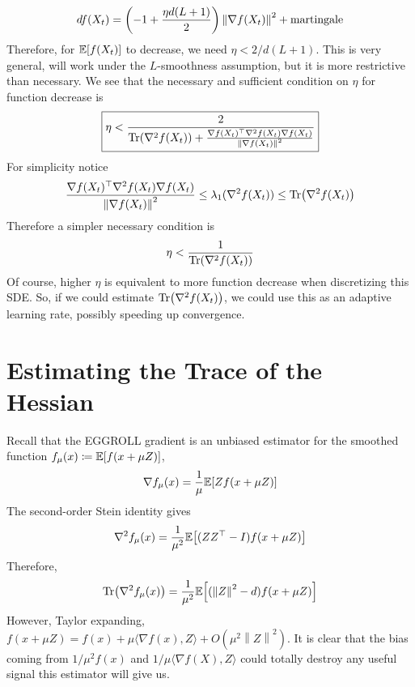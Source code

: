 \documentclass[twoside,11pt]{article}
\newcommand{\mg}[1]{\left \| #1 \right\|}
\newcommand{\E}{\mathbb{E}\qty}
\renewcommand{\grad}{\nabla}
\newcommand{\1}{\mathbbm{1}}
\begin{document}
\begin{align*}
    df(X_t) = \qty(-1+\frac{\eta d(L+1)}{2}) \mg{\grad f(X_t)}^2 + \mathrm{martingale}
\end{align*}
Therefore, for $\E[f(X_t)]$ to decrease, we need $\eta < 2/d(L+1)$. This is very general, will work under the $L$-smoothness assumption, but it is more restrictive than necessary. We see that the necessary and sufficient condition on $\eta$ for function decrease is
\begin{align*}
    \boxed{\eta < \frac{2}{\Tr(\grad^2 f(X_t)) + \frac{\grad f(X_t)^\top \grad^2 f(X_t) \grad f(X_t)}{\mg{\grad f(X_t)}^2}}}
\end{align*}
For simplicity notice
\begin{align*}
    \frac{\grad f(X_t)^\top \grad^2 f(X_t) \grad f(X_t)}{\mg{\grad f(X_t)}^2} \leq \lambda_1(\grad^2 f(X_t)) \leq \Tr(\grad^2 f(X_t))
\end{align*}
Therefore a simpler necessary condition is
\begin{align*}
    \eta < \frac{1}{\Tr(\grad^2 f(X_t))}
\end{align*}
Of course, higher $\eta$ is equivalent to more function decrease when discretizing this SDE. So, if we could estimate $\Tr(\grad^2 f(X_t))$, we could use this as an adaptive learning rate, possibly speeding up convergence.


\section{Estimating the Trace of the Hessian}
Recall that the EGGROLL gradient is an unbiased estimator for the smoothed function $f_\mu(x) \coloneqq \E[f(x+\mu Z)]$,
\begin{align*}
    \grad f_\mu(x) = \frac{1}{\mu} \E[Zf(x+\mu Z)]
\end{align*}
The second-order Stein identity gives
\begin{align*}
    \grad^2 f_\mu(x) = \frac{1}{\mu^2} \E[(ZZ^\top - I) f(x+\mu Z)]
\end{align*}
Therefore,
\begin{align*}
    \Tr(\grad^2 f_\mu(x)) = \frac{1}{\mu^2} \E[(\mg{Z}^2 - d)f(x + \mu Z)]
\end{align*}
However, Taylor expanding, $f(x+\mu Z) = f(x) + \mu \langle \grad f(x), Z\rangle + O(\mu^2 \mg{Z}^2)$. It is clear that the bias coming from $1/\mu^2 f(x)$ and $1/\mu \langle \grad f(X), Z \rangle$ could totally destroy any useful signal this estimator will give us. 
\end{document}
